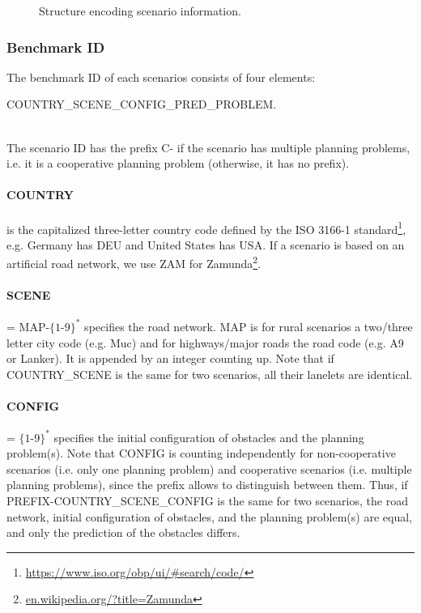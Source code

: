 \begin{figure}[!htpb]
	\small
	\caption{Structure encoding scenario information.}
	\label{fig:structureScenario}
\end{figure}
\newpage %


\subsubsection{Benchmark ID} \label{subsec:id}
The benchmark ID of each scenarios consists of four elements: \\
\centerline{COUNTRY\_SCENE\_CONFIG\_PRED\_PROBLEM.} \\
The scenario ID has the prefix C- if the scenario has multiple planning problems, i.e. it is a cooperative planning problem (otherwise, it has no prefix).

\paragraph{COUNTRY} is the capitalized three-letter country code defined by the ISO 3166-1 standard\footnote{\url{https://www.iso.org/obp/ui/\#search/code/}}, e.g. Germany has DEU and United States has USA.
If a scenario is based on an artificial road network, we use ZAM for Zamunda\footnote{\href{https://en.wikipedia.org/?title=Zamunda&redirect=no}{en.wikipedia.org/?title=Zamunda}}.

\paragraph{SCENE} = MAP-$\{1$-$9\}^*$ specifies the road network. MAP is for rural scenarios a two/three letter city code (e.g. Muc) and for highways/major roads the road code (e.g. A9 or Lanker). It is appended by an integer counting up. Note that if COUNTRY\_SCENE is the same for two scenarios, all their lanelets are identical.

\paragraph{CONFIG} = $\{1$-$9\}^*$ specifies the initial configuration of obstacles and the planning problem(s). Note that CONFIG is counting independently for non-cooperative scenarios (i.e. only one planning problem) and cooperative scenarios (i.e. multiple planning problems), since the prefix allows to distinguish between them. Thus, if PREFIX-COUNTRY\_SCENE\_CONFIG is the same for two scenarios, the road network, initial configuration of obstacles, and the planning problem(s) are equal, and only the prediction of the obstacles differs.

